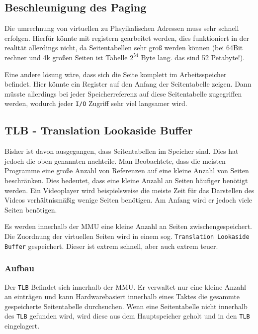 \subsection{Beschleunigung des Paging}

Die umrechnung von virtuellen zu Phsyikalischen Adressen muss sehr schnell erfolgen. Hierfür könnte mit registern gearbeitet werden, dies funktioniert in der realität allerdings nicht, da Seitentabellen sehr groß werden können (bei 64Bit rechner und 4k großen Seiten ist Tabelle $2^{54}$ Byte lang. das sind 52 Petabyte!).

Eine andere lösung wäre, dass sich die Seite komplett im Arbeitsspeicher befindet. Hier könnte ein Register auf den Anfang der Seitentabelle zeigen. Dann müsste allerdings bei jeder Speicherreferenz auf diese Seitentabelle zugegriffen werden, wodurch jeder \texttt{I/O} Zugriff sehr viel langsamer wird.

\subsection{TLB - Translation Lookaside Buffer}

Bisher ist davon ausgegangen, dass Seitentabellen im Speicher sind. Dies hat jedoch die oben genannten nachteile. Man Beobachtete, dass die meisten Programme eine große Anzahl von Referenzen auf eine kleine Anzahl von Seiten beschränken. Dies bedeutet, dass eine kleine Anzahl an Seiten häufiger benötigt werden. Ein Videoplayer wird beispielsweise die meiste Zeit für das Darstellen des Videos verhältnismäßig wenige Seiten benötigen. Am Anfang wird er jedoch viele Seiten benötigen. 

Es werden innerhalb der MMU eine kleine Anzahl an Seiten zwischengespeichert. Die Zuordnung der virtuellen Seiten wird in einem sog. \texttt{Translation Lookaside Buffer} gespeichert. Dieser ist extrem schnell, aber auch extrem teuer.

\subsubsection{Aufbau}

Der \texttt{TLB} Befindet sich innerhalb der MMU. Er verwaltet nur eine kleine Anzahl an einträgen und kann Hardwarebasiert innerhalb eines Taktes die gesammte gespeicherte Seitentabelle durchsuchen. Wenn eine Seitentabelle nicht innerhalb des \texttt{TLB} gefunden wird, wird diese aus dem Hauptspeicher geholt und in den \texttt{TLB} eingelagert.

